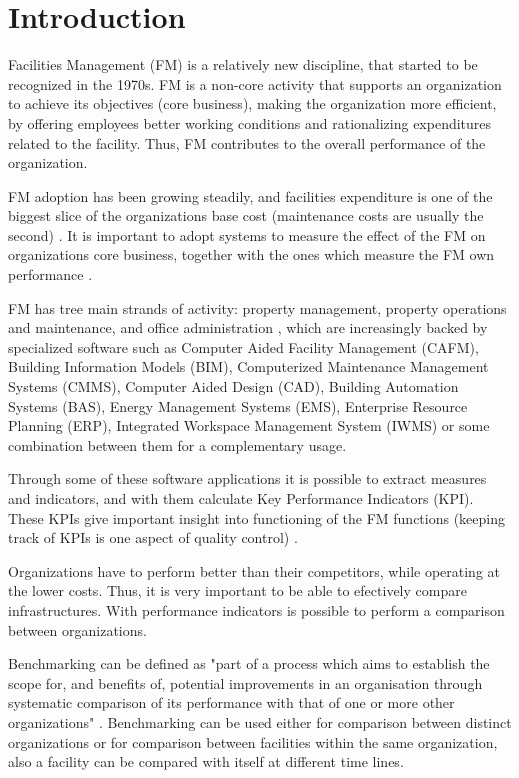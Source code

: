 
% 
% 

\section{Introduction}
\label{Introduction}

Facilities Management (FM) is a relatively new discipline, that started to be recognized in the 1970s. 
FM is a non-core activity that supports an organization to achieve its objectives (core business), making the organization more efficient, by offering employees better working conditions and rationalizing expenditures related to the facility. Thus, FM contributes to the overall performance of the organization. 

FM adoption has been growing steadily, and facilities expenditure is one of the biggest slice of the organizations base cost (maintenance costs are usually the second) \cite{Roka-Madarasz2010}.
It is important to adopt systems to measure the effect of the FM on organizations core business, together with the ones which measure the FM own performance \cite{Pitt2008}.

FM has tree main strands of activity: property management, property operations and maintenance, and office administration \cite{Pitt2008}, which are increasingly backed by specialized software such as Computer Aided Facility Management (CAFM), Building Information Models  (BIM), Computerized Maintenance Management Systems (CMMS), Computer Aided Design (CAD), Building Automation Systems (BAS), Energy Management Systems (EMS), Enterprise Resource Planning (ERP), Integrated Workspace Management System (IWMS) or some combination between them for a complementary usage. 

Through some of these software applications it is possible to extract measures and indicators, and with them calculate Key Performance Indicators (KPI). These KPIs give important insight into functioning of the FM functions (keeping track of KPIs is one aspect of quality control)  \cite{Fitz-Gibbon1990}.

Organizations have to perform better than their competitors, while operating at the lower costs. Thus, it is very important to be able to efectively compare infrastructures. With performance indicators is possible to perform a comparison between organizations. 

Benchmarking can be defined as "part of a process which aims to establish the scope for, and benefits of, potential improvements in an organisation through systematic comparison of its performance with that of one or more other organizations" \cite{EN15221-7}. Benchmarking can be used either for comparison between distinct organizations or for comparison between facilities within the same organization, also a facility can be compared with itself at different time lines.

